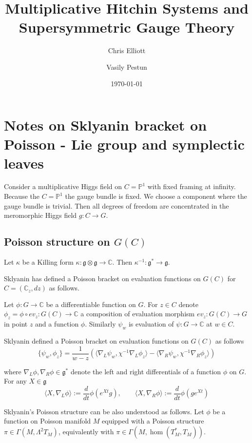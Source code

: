 \documentclass[11pt, oneside, reqno]{amsart}
\title{Multiplicative Hitchin Systems and Supersymmetric Gauge Theory}
\author{Chris Elliott \and Vasily Pestun}
\date{\today}
\theoremstyle{definition} \newtheorem{definition}{Definition}[section]
\theoremstyle{definition} \newtheorem{remark}[definition]{Remark}
\theoremstyle{definition} \newtheorem{remarks}[definition]{Remarks}
\theoremstyle{definition} \newtheorem{question}[definition]{Question}
\theoremstyle{definition} \newtheorem*{note}{Note}
\theoremstyle{definition} \newtheorem{example}[definition]{Example}
\theoremstyle{definition} \newtheorem{examples}[definition]{Examples}
\renewcommand{\gg}{\mathfrak{g}}
\begin{document}
\section{Notes on Sklyanin bracket on Poisson - Lie group
  and symplectic leaves}

Consider a multiplicative Higgs field on $C = \mathbb{P}^{1}$
with fixed framing at infinity. Because the $C = \mathbb{P}^{1}$ the
gauge bundle is fixed. We choose a component where the gauge bundle is trivial.
Then all degrees of freedom are concentrated
in the meromorphic Higgs field $g: C \to G$.

\subsection{Poisson structure on $G(C)$} 
Let $\kappa$ be a Killing form $\kappa: \gg \otimes \gg \to \mathbb{C}$.
Then $\kappa^{-1}: \gg^{*} \to \gg$.

Sklyanin has defined a Poisson bracket on evaluation functions on $G(C)$ for $C = (\mathbb{C}_z, dz)$ as follows. 

Let $\phi: G \to \mathbb{C}$ be a differentiable function on $G$. For $z \in C$
denote $\phi_{z} =  \phi \circ ev_{z} : G(C) \to \mathbb{C}$ a composition
of evaluation morphism  $ev_{z}: G(C) \to G$ in point $z$ and a function $\phi$.
Similarly $\psi_{w}$ is evaluation of $\psi: G \to \mathbb{C}$ at $w \in C$.

Sklyanin defined a Poisson bracket on evaluation functions on $G(C)$ as follows
\begin{equation}
\label{eq:Sklyanin}
  \{ \psi_{w}, \phi_{z} \} = \frac{1}{w - z}(\langle \nabla_{L} \psi_w, \chi^{-1} \nabla_{L} \phi_{z}
\rangle  - \langle \nabla_{R} \psi_{w},  \chi^{-1} \nabla_{R} \phi_{z}\rangle)
\end{equation}

where $\nabla_{L}\phi , \nabla_{R}\phi \in \gg^{*} $ denote the left and right differentials
of a function $\phi$ on $G$. For any $X \in \gg$
\begin{equation}
  \langle X, \nabla_{L} \phi \rangle := \frac{d}{dt} \phi(e^{Xt} g),
  \qquad \langle X, \nabla_{R} \phi \rangle := \frac{d}{dt} \phi(g e^{Xt})
\end{equation}

Sklyanin's Poisson structure can be also understood as follows. Let $\phi$ be a function
on Poisson manifold $M$ equipped with a Poisson structure $\pi \in \Gamma(M,\Lambda^2 T_{M})$,
equivalently with $\pi \in \Gamma(M, \hom (T_{M}^{*}, T_{M}))$. 
\end{document}
